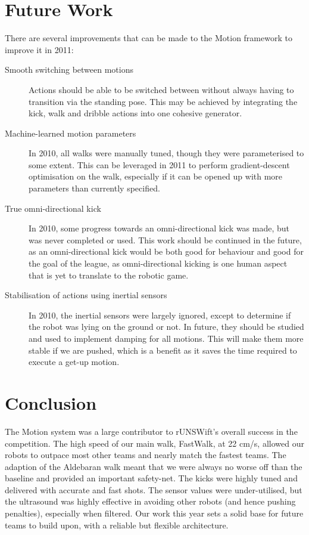 \documentclass[pdftex,11pt,a4paper]{report}
\begin{document}
\section{Future Work}
There are several improvements that can be made to the Motion framework to
improve it in 2011:
\begin{description}
    \item[Smooth switching between motions] Actions should be able to be
        switched between without always having to transition via the
        standing pose. This may be achieved by integrating the kick, walk
        and dribble actions into one cohesive generator.
    \item[Machine-learned motion parameters] In 2010, all walks were
        manually tuned, though they were parameterised to some extent. This
        can be leveraged in 2011 to perform gradient-descent optimisation
        on the walk, especially if it can be opened up with more parameters
        than currently specified.
    \item[True omni-directional kick] In 2010, some progress towards an
        omni-directional kick was made, but was never completed or used.
        This work should be continued in the future, as an omni-directional
        kick would be both good for behaviour and good for the goal of the
        league, as omni-directional kicking is one human aspect that is yet
        to translate to the robotic game.
    \item[Stabilisation of actions using inertial sensors] In 2010, the
        inertial sensors were largely ignored, except to determine if the
        robot was lying on the ground or not. In future, they should be
        studied and used to implement damping for all motions. This will
        make them more stable if we are pushed, which is a benefit as it
        saves the time required to execute a get-up motion.
\end{description}

\section{Conclusion}
The Motion system was a large contributor to rUNSWift's overall success in
the competition. The high speed of our main walk, FastWalk, at 22 cm/s,
allowed our robots to outpace most other teams and nearly match the fastest
teams. The adaption of the Aldebaran walk meant that we were always no
worse off than the baseline and provided an important safety-net. The kicks
were highly tuned and delivered with accurate and fast shots. The sensor
values were under-utilised, but the ultrasound was highly effective in
avoiding other robots (and hence pushing penalties), especially when
filtered. Our work this year sets a solid base for future teams to build
upon, with a reliable but flexible architecture.
\end{document}
